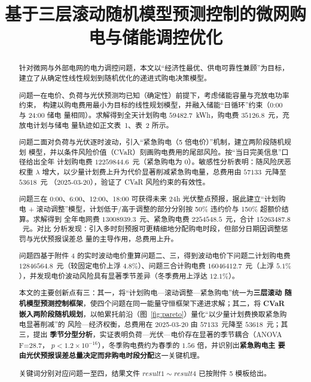 \documentclass[withoutpreface]{cumcmthesis}
\title{基于三层滚动随机模型预测控制的微网购电与储能调控优化}
\begin{document}
\maketitle

\begin{abstract}
    针对微网与外部电网的电力调控问题，本文以“经济性最优、供电可靠性兼顾”为目标，
    建立了从确定性线性规划到随机优化的递进式购电决策模型。

    问题一在电价、负荷与光伏预测均已知（确定性）前提下，考虑储能容量与充放电功率约束，
    构建以购电费用最小为目标的线性规划模型，并融入储能“日循环”约束（0:00 与 24:00 储电
    量相同）。求解得到全天计划购电 $59482.7$~kWh，购电费 $35126.8$~元，充放电计划与储电
    量轨迹如正文表~1、表~2 所示。

    问题二面对负荷与光伏逐时波动，引入“紧急购电（5 倍电价）”机制，建立两阶段随机规划
    模型，并以条件风险价值（CVaR）刻画购电费用的尾部风险。按“当日完美信息”口径给出全年
    计划购电费 $12259844.6$~元（紧急购电为 0）。敏感性分析表明：随风险厌恶权重 $\lambda$
    增大，以少量计划费上升为代价显著削减紧急购电量，总费用由 $57133$~元降至 $53618$~元
    （2025-03-20），验证了 CVaR 风险约束的有效性。

    问题三在 0:00、6:00、12:00、18:00 可获得未来 24h 光伏整点预报，据此建立“计划购电 +
    滚动调整”模型，计划低于/高于调整的部分分别按 50\% 违约价与 150\% 超额价结算。求解得到
    全年电网费 $13008939.3$~元、紧急购电费 $2254548.5$~元，合计 $15263487.8$~元。对比
    分析发现：引入多时刻预报可更精细地分配购电时段，但部分日期因调整惩罚与光伏预报误差总
    量的主导作用，总费用上升。

    问题四基于附件 4 的实时波动电价重算问题二、三，得到波动电价下问题二计划购电费
    $12846564.8$~元（较固定电价上浮 $4.8\%$）、问题三合计购电费 $16046412.7$~元（上浮
    $5.1\%$），并发现电价波动风险具有显著季节差异（冬季费用上浮达 $12.1\%$）。

    本文的主要创新点有三：其一，将“计划购电—滚动调整—紧急购电”统一为\textbf{三层滚动
    随机模型预测控制框架}，使四个问题在同一能量守恒框架下递进求解；其二，将 \textbf{CVaR
    嵌入两阶段随机规划}，以帕累托前沿（图~\ref{fig:pareto}）量化“以少量计划费换取紧急购电显著削减”的
    风险—经济权衡，总费用在 2025-03-20 由 $57133$~元降至 $53618$~元；其三，提出
    \textbf{季节分型分析}，实证表明负荷—光伏—电价存在显著的季节耦合（ANOVA F=28.7，
    $p<1.2\times10^{-16}$），冬季购电费约为春季的 $1.56$ 倍，并识别出\textbf{紧急购电主
    要由光伏预报误差总量决定而非购电时段分配}这一关键机理。

    关键词分别对应问题一至四，结果文件 $result1\sim result4$ 已按附件 5 模板给出。

\end{abstract}
\end{document}
